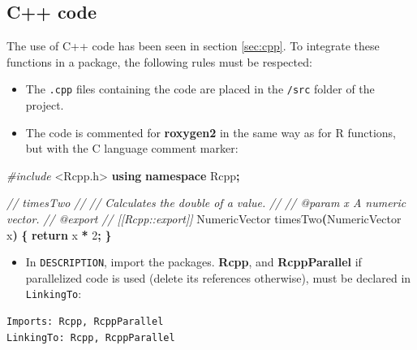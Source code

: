 \documentclass[
  12pt,
  american,
  a4paper,
  extrafontsizes,onecolumn,openright
  ]{memoir}
\newenvironment{Shaded}{\begin{snugshade}}{\end{snugshade}}
\newcommand{\CommentTok}[1]{\textcolor[rgb]{0.56,0.35,0.01}{\textit{#1}}}
\newcommand{\ControlFlowTok}[1]{\textcolor[rgb]{0.13,0.29,0.53}{\textbf{#1}}}
\newcommand{\DecValTok}[1]{\textcolor[rgb]{0.00,0.00,0.81}{#1}}
\newcommand{\ImportTok}[1]{#1}
\newcommand{\KeywordTok}[1]{\textcolor[rgb]{0.13,0.29,0.53}{\textbf{#1}}}
\newcommand{\NormalTok}[1]{#1}
\newcommand{\OperatorTok}[1]{\textcolor[rgb]{0.81,0.36,0.00}{\textbf{#1}}}
\newcommand{\PreprocessorTok}[1]{\textcolor[rgb]{0.56,0.35,0.01}{\textit{#1}}}
\providecommand{\tightlist}{%
  \setlength{\itemsep}{0pt}\setlength{\parskip}{0pt}}
\begin{document}
\subsection{C++ code}\label{c-code}

The use of C++ code has been seen in section \ref{sec:cpp}.
To integrate these functions in a package, the following rules must be respected:

\begin{itemize}
\tightlist
\item
  The \texttt{.cpp} files containing the code are placed in the \texttt{/src} folder of the project.
\item
  The code is commented for \textbf{roxygen2} in the same way as for R functions, but with the C language comment marker:
\end{itemize}

\scriptsize

\begin{Shaded}
\begin{Highlighting}[]
\PreprocessorTok{\#include }\ImportTok{\textless{}Rcpp.h\textgreater{}}
\KeywordTok{using} \KeywordTok{namespace}\NormalTok{ Rcpp}\OperatorTok{;}

\CommentTok{//\textquotesingle{} timesTwo}
\CommentTok{//\textquotesingle{}}
\CommentTok{//\textquotesingle{} Calculates the double of a value.}
\CommentTok{//\textquotesingle{}}
\CommentTok{//\textquotesingle{} @param x A numeric vector.}
\CommentTok{//\textquotesingle{} @export}
\CommentTok{// [[Rcpp::export]]}
\NormalTok{NumericVector timesTwo}\OperatorTok{(}\NormalTok{NumericVector x}\OperatorTok{)} \OperatorTok{\{}
  \ControlFlowTok{return}\NormalTok{ x }\OperatorTok{*} \DecValTok{2}\OperatorTok{;}
\OperatorTok{\}}
\end{Highlighting}
\end{Shaded}

\normalsize

\begin{itemize}
\tightlist
\item
  In \texttt{DESCRIPTION}, import the packages.
  \textbf{Rcpp}, and \textbf{RcppParallel} if parallelized code is used (delete its references otherwise), must be declared in \texttt{LinkingTo}:
\end{itemize}

\begin{verbatim}
Imports: Rcpp, RcppParallel
LinkingTo: Rcpp, RcppParallel
\end{verbatim}
\end{document}
